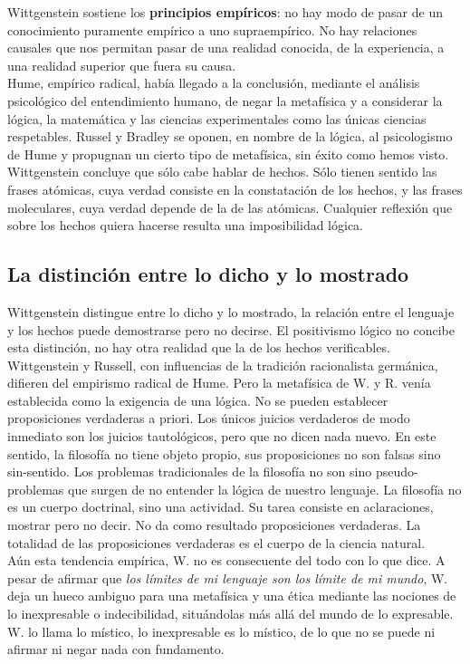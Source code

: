 \documentclass[a4paper, 11pt, twocolumn, spanish]{article}
\begin{document}
Wittgenstein sostiene los \textbf{principios empíricos}: no hay modo de pasar
de un conocimiento puramente empírico a uno supraempírico. No hay
relaciones causales que nos permitan pasar de una realidad conocida,
de la experiencia, a una realidad superior que fuera su causa.\\

Hume, empírico radical, había llegado a la conclusión, mediante el
análisis psicológico del entendimiento humano, de negar la metafísica
y a considerar la lógica, la matemática y las ciencias experimentales
como las únicas ciencias respetables. Russel y Bradley se oponen, en
nombre de la lógica, al psicologismo de Hume y propugnan un cierto
tipo de metafísica, sin éxito como hemos visto. Wittgenstein concluye
que sólo cabe hablar de hechos. Sólo tienen sentido las frases
atómicas, cuya verdad consiste en la constatación de los hechos, y las
frases moleculares, cuya verdad depende de la de las
atómicas. Cualquier reflexión que sobre los hechos quiera hacerse
resulta una imposibilidad lógica.

\subsection{La distinción entre lo dicho y lo mostrado}
\label{sec:orgfe0c6f5}
Wittgenstein distingue entre lo dicho y lo mostrado, la relación entre
el lenguaje y los hechos puede demostrarse pero no decirse. El
positivismo lógico no concibe esta distinción, no hay otra realidad
que la de los hechos verificables. Wittgenstein y Russell, con
influencias de la tradición racionalista germánica, difieren del
empirismo radical de Hume. Pero la metafísica de W. y R. venía
establecida como la exigencia de una lógica. No se pueden establecer
proposiciones verdaderas a priori. Los únicos juicios verdaderos de
modo inmediato son los juicios tautológicos, pero que no dicen nada
nuevo. En este sentido, la filosofía no tiene objeto propio, sus
proposiciones no son falsas sino sin-sentido. Los problemas
tradicionales de la filosofía no son sino pseudo-problemas que surgen
de no entender la lógica de nuestro lenguaje. La filosofía no es un
cuerpo doctrinal, sino una actividad. Su tarea consiste en
aclaraciones, mostrar pero no decir. No da como resultado
proposiciones verdaderas. La totalidad de las proposiciones verdaderas
es el cuerpo de la ciencia natural.\\

Aún esta tendencia empírica, W. no es consecuente del todo con lo que
dice. A pesar de afirmar que \emph{los límites de mi lenguaje son los
límite de mi mundo}, W. deja un hueco ambiguo para una metafísica y
una ética mediante las nociones de lo inexpresable o indecibilidad,
situándolas más allá del mundo de lo expresable. W. lo llama lo
místico, lo inexpresable es lo místico, de lo que no se puede ni
afirmar ni negar nada con fundamento.\\
\end{document}
